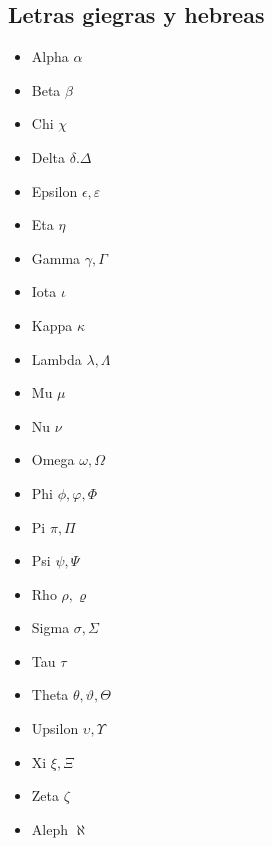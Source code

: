 \documentclass{article}
\begin{document}
\subsection{Letras giegras y hebreas}
\begin{itemize}
    \item Alpha $\alpha$
    \item Beta $\beta$
    \item Chi $\chi$
    \item Delta $\delta. \Delta$
    \item Epsilon $\epsilon, \varepsilon$
    \item Eta $\eta$
    \item Gamma $\gamma, \Gamma$
    \item Iota $\iota$
    \item Kappa $\kappa$
    \item Lambda $\lambda, \Lambda$
    \item Mu $\mu$
    \item Nu $\nu$
    \item Omega $\omega, \Omega$
    \item Phi $\phi, \varphi, \Phi$
    \item Pi $\pi, \Pi$
    \item Psi $\psi, \Psi$
    \item Rho $\rho, \varrho$
    \item Sigma $\sigma, \Sigma$
    \item Tau $\tau$
    \item Theta $\theta, \vartheta, \Theta$
    \item Upsilon $\upsilon, \Upsilon$
    \item Xi $\xi, \Xi$
    \item Zeta $\zeta$
    \item Aleph $\aleph$
\end{itemize}
\end{document}
